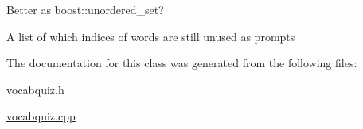 Better as boost::unordered\_\-set? 

A list of which indices of words are still unused as prompts 

The documentation for this class was generated from the following files:\begin{DoxyCompactItemize}
\item 
vocabquiz.h\item 
\hyperlink{vocabquiz_8cpp}{vocabquiz.cpp}\end{DoxyCompactItemize}
